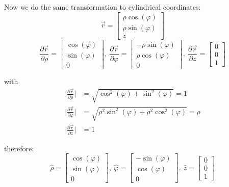 \documentclass[11pt,a4paper]{article}
\begin{document}
\begin{enumerate}
Now we do the same transformation to cylindrical coordinates:
\begin{equation*}
\vec{r}=
\begin{bmatrix}
\rho\cos(\varphi) \\
\rho\sin(\varphi) \\
z
\end{bmatrix}
\end{equation*}
\begin{equation*}
\frac{\partial\vec{r}}{\partial\rho}=
\begin{bmatrix}
\cos(\varphi) \\
\sin(\varphi) \\
0
\end{bmatrix},\ 
\frac{\partial\vec{r}}{\partial\varphi}=
\begin{bmatrix}
-\rho\sin(\varphi) \\
\rho\cos(\varphi) \\
0
\end{bmatrix},\ 
\frac{\partial\vec{r}}{\partial z}=
\begin{bmatrix}
0 \\
0 \\
1
\end{bmatrix}
\end{equation*}

with
\begin{align*}
\bigg|\frac{\partial\vec{r}}{\partial\rho}\bigg|&=\sqrt{\cos^2(\varphi)+\sin^2(\varphi)}=1 \\
\bigg|\frac{\partial\vec{r}}{\partial\varphi}\bigg|&=\sqrt{\rho^2\sin^2(\varphi)+\rho^2\cos^2(\varphi)}=\rho \\
\bigg|\frac{\partial\vec{r}}{\partial z}\bigg|&=1
\end{align*}

therefore:
\begin{equation}
\hat{\rho}=
\begin{bmatrix}
\cos(\varphi) \\
\sin(\varphi) \\
0
\end{bmatrix},\
\hat{\varphi}=
\begin{bmatrix}
-\sin(\varphi) \\
\cos(\varphi) \\
0
\end{bmatrix},\
\hat{z}=
\begin{bmatrix}
0 \\
0 \\
1
\end{bmatrix}
\end{equation}


\end{enumerate}
\end{document}
